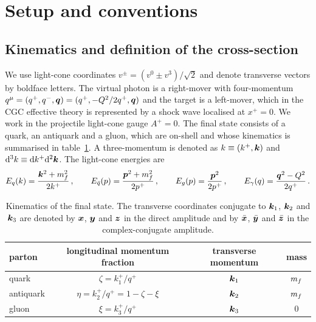 \section{Setup and conventions}
\label{sec:setup}

\subsection{Kinematics and definition of the cross-section}
\label{sec:kin}

We use light-cone coordinates $v^\pm=(v^0\pm v^3)/\sqrt2$ and denote transverse vectors by boldface
letters. The virtual photon is a right-mover with four-momentum
$q^\mu=(q^+,q^-,\bm{q})=(q^+,-Q^2/2q^+,\bm{q})$ and the target is a left-mover, which in the CGC effective
theory is represented by a shock wave localised at $x^+=0$. We work in the projectile light-cone gauge
$A^+=0$. The final state consists of a quark, an antiquark and a gluon, which are on-shell and whose
kinematics is summarised in table~\ref{tab:kin}. A three-momentum is denoted as $k\equiv(k^+,\bm{k})$ and
${\rm d}^3k\equiv{\rm d} k^+{\rm d}^2\bm{k}$. The light-cone energies are
\begin{equation}
E_q(k)=\frac{\bm{k}^2+m_f^2}{2k^+}\,,\qquad E_{\bar q}(p)=\frac{\bm{p}^2+m_f^2}{2p^+}\,,\qquad
E_g(p)=\frac{\bm{p}^2}{2p^+}\,,\qquad E_\gamma(q)=\frac{\bm{q}^2-Q^2}{2q^+}\,.
\end{equation}

\begin{table}[t]
\centering
\begin{tabular}{lccc}
\toprule
parton & longitudinal momentum fraction & transverse momentum & mass\\
\midrule
quark & $\zeta=k_1^+/q^+$ & $\bm{k}_1$ & $m_f$\\
antiquark & $\eta=k_2^+/q^+=1-\zeta-\xi$ & $\bm{k}_2$ & $m_f$\\
gluon & $\xi=k_3^+/q^+$ & $\bm{k}_3$ & $0$\\
\bottomrule
\end{tabular}
\caption{Kinematics of the final state. The transverse coordinates conjugate to $\bm{k}_1$, $\bm{k}_2$ and
$\bm{k}_3$ are denoted by $\bm{x}$, $\bm{y}$ and $\bm{z}$ in the direct amplitude and by $\bar{\bm{x}}$, $\bar{\bm{y}}$ and $\bar{\bm{z}}$ in the
complex-conjugate amplitude.}
\label{tab:kin}
\end{table}

